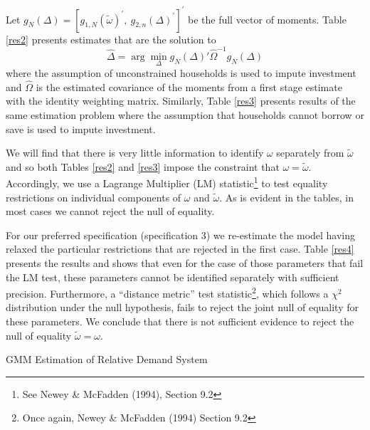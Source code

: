 \documentclass{article}
\begin{document}
Let $g_{N}(\Delta) = [g_{1,N}(\tilde{\omega})^\prime,\ g_{2,n}(\Delta)^\prime]^\prime$ be the full vector of moments. Table \ref{res2} presents estimates that are the solution to
\[ \hat{\Delta} = \arg\min_{\Delta}g_{N}(\Delta)'\hat{\Omega}^{-1}g_{N}(\Delta) \]
where the assumption of unconstrained households is used to impute investment and $\hat{\Omega}$ is the estimated covariance of the moments from a first stage estimate with the identity weighting matrix. Similarly, Table \ref{res3} presents results of the same estimation problem where the assumption that households cannot borrow or save is used to impute investment.

We will find that there is very little information to identify $\omega$ separately from $\tilde{\omega}$ and so both Tables \ref{res2} and \ref{res3} impose the constraint that $\omega=\tilde{\omega}$. Accordingly, we use a Lagrange Multiplier (LM) statistic\footnote{See Newey \& McFadden (1994), Section 9.2} to test equality restrictions on individual components of $\omega$ and $\tilde{\omega}$. As is evident in the tables, in most cases we cannot reject the null of equality. 

For our preferred specification (specification 3) we re-estimate the model having relaxed the particular restrictions that are rejected in the first case. Table \ref{res4} presents the results and shows that even for the case of those parameters that fail the LM test, these parameters cannot be identified separately with sufficient precision. Furthermore, a ``distance metric'' test statistic\footnote{Once again, Newey \& McFadden (1994) Section 9.2}, which follows a $\chi^2$ distribution under the null hypothesis, fails to reject the joint null of equality for these parameters. We conclude that there is not sufficient evidence to reject the null of equality $\tilde{\omega}=\omega$.


\begin{table}\footnotesize\caption{\label{res1}GMM Estimation of Relative Demand System}
    \begin{center}
        
        \captionsetup{width=0.7\textwidth}
    \end{center}
\end{table}

%         
\end{document}
